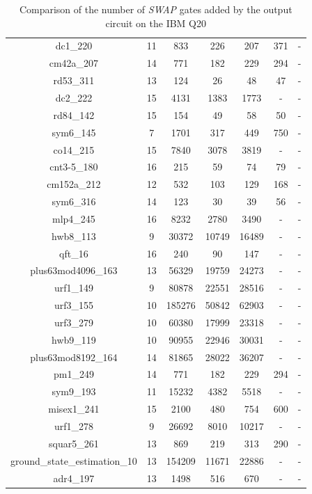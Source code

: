 \documentclass[runningheads]{llncs}
\begin{document}
\begin{table}[H]
\begin{center}
\begin{tabular}{|c|c|c|c|c|c|c|}
dc1\_220 & 11 & 833 & 226 & 207 & 371 & - \\ 
cm42a\_207 & 14 & 771 & 182 & 229 & 294 & - \\ 
rd53\_311 & 13 & 124 & 26 & 48 & 47 & - \\ 
dc2\_222 & 15 & 4131 & 1383 & 1773 & - & - \\ 
rd84\_142 & 15 & 154 & 49 & 58 & 50 & - \\ 
sym6\_145 & 7 & 1701 & 317 & 449 & 750 & - \\ 
co14\_215 & 15 & 7840 & 3078 & 3819 & - & - \\ 
cnt3-5\_180 & 16 & 215 & 59 & 74 & 79 & - \\ 
cm152a\_212 & 12 & 532 & 103 & 129 & 168 & - \\ 
sym6\_316 & 14 & 123 & 30 & 39 & 56 & - \\ 
mlp4\_245 & 16 & 8232 & 2780 & 3490 & - & - \\ 
hwb8\_113 & 9 & 30372 & 10749 & 16489 & - & - \\ 
qft\_16 & 16 & 240 & 90 & 147 & - & - \\ 
plus63mod4096\_163 & 13 & 56329 & 19759 & 24273 & - & - \\ 
urf1\_149 & 9 & 80878 & 22551 & 28516 & - & - \\ 
urf3\_155 & 10 & 185276 & 50842 & 62903 & - & - \\ 
urf3\_279 & 10 & 60380 & 17999 & 23318 & - & - \\ 
hwb9\_119 & 10 & 90955 & 22946 & 30031 & - & - \\ 
plus63mod8192\_164 & 14 & 81865 & 28022 & 36207 & - & - \\ 
pm1\_249 & 14 & 771 & 182 & 229 & 294 & - \\ 
sym9\_193 & 11 & 15232 & 4382 & 5518 & - & - \\ 
misex1\_241 & 15 & 2100 & 480 & 754 & 600 & - \\ 
urf1\_278 & 9 & 26692 & 8010 & 10217 & - & - \\ 
squar5\_261 & 13 & 869 & 219 & 313 & 290 & - \\ 
ground\_state\_estimation\_10 & 13 & 154209 & 11671 & 22886 & - & - \\ 
adr4\_197 & 13 & 1498 & 516 & 670 & - & - \\ 
			\hline
			\end{tabular} 
			\end{center}	
			\caption{Comparison of  the number of \textit{SWAP} gates added by the 
			output circuit on the IBM Q20 }
			\label{tab4}  
			\end{table}
\end{document}
